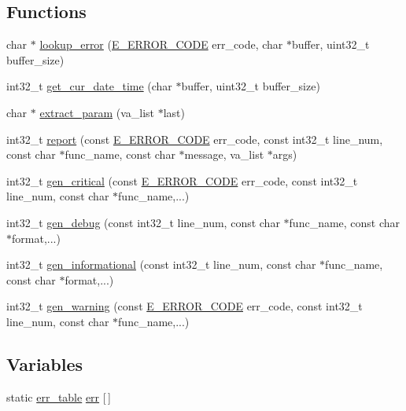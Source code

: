\subsection*{Functions}
\begin{DoxyCompactItemize}
\item 
char $\ast$ \hyperlink{error_8cc_a41a98a7a0cc1961bdcd8a8a782909fe0}{lookup\-\_\-error} (\hyperlink{error_8h_a02135c3838fd11f1cf862ae2daf29e4c}{E\-\_\-\-E\-R\-R\-O\-R\-\_\-\-C\-O\-D\-E} err\-\_\-code, char $\ast$buffer, uint32\-\_\-t buffer\-\_\-size)
\item 
int32\-\_\-t \hyperlink{error_8cc_a5788f5ff43a324150d753689966c4126}{get\-\_\-cur\-\_\-date\-\_\-time} (char $\ast$buffer, uint32\-\_\-t buffer\-\_\-size)
\item 
char $\ast$ \hyperlink{error_8cc_adcb65b9305341e99dd8a03c9ae58690e}{extract\-\_\-param} (va\-\_\-list $\ast$last)
\item 
int32\-\_\-t \hyperlink{error_8cc_ab2431ac942072c3c5bec968d7aa8c93f}{report} (const \hyperlink{error_8h_a02135c3838fd11f1cf862ae2daf29e4c}{E\-\_\-\-E\-R\-R\-O\-R\-\_\-\-C\-O\-D\-E} err\-\_\-code, const int32\-\_\-t line\-\_\-num, const char $\ast$func\-\_\-name, const char $\ast$message, va\-\_\-list $\ast$args)
\item 
int32\-\_\-t \hyperlink{error_8cc_ad7abb0eedaaa25e5cce2141a13bd4af5}{gen\-\_\-critical} (const \hyperlink{error_8h_a02135c3838fd11f1cf862ae2daf29e4c}{E\-\_\-\-E\-R\-R\-O\-R\-\_\-\-C\-O\-D\-E} err\-\_\-code, const int32\-\_\-t line\-\_\-num, const char $\ast$func\-\_\-name,...)
\item 
int32\-\_\-t \hyperlink{error_8cc_a9a006343667fc7ba3700717a088db087}{gen\-\_\-debug} (const int32\-\_\-t line\-\_\-num, const char $\ast$func\-\_\-name, const char $\ast$format,...)
\item 
int32\-\_\-t \hyperlink{error_8cc_a8766f7f2f28c3dcb552239443cbb1df6}{gen\-\_\-informational} (const int32\-\_\-t line\-\_\-num, const char $\ast$func\-\_\-name, const char $\ast$format,...)
\item 
int32\-\_\-t \hyperlink{error_8cc_a41deb0a263cb65f98cded303082fc4e0}{gen\-\_\-warning} (const \hyperlink{error_8h_a02135c3838fd11f1cf862ae2daf29e4c}{E\-\_\-\-E\-R\-R\-O\-R\-\_\-\-C\-O\-D\-E} err\-\_\-code, const int32\-\_\-t line\-\_\-num, const char $\ast$func\-\_\-name,...)
\end{DoxyCompactItemize}
\subsection*{Variables}
\begin{DoxyCompactItemize}
\item 
static \hyperlink{structerr__table}{err\-\_\-table} \hyperlink{error_8cc_a2e4011b05d0091e60fb89c626a3b0596}{err} \mbox{[}$\,$\mbox{]}
\end{DoxyCompactItemize}


